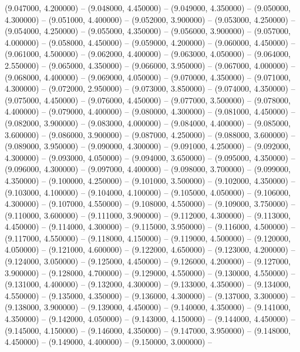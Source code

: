(9.047000, 4.200000) -- 
(9.048000, 4.450000) -- 
(9.049000, 4.350000) -- 
(9.050000, 4.300000) -- 
(9.051000, 4.400000) -- 
(9.052000, 3.900000) -- 
(9.053000, 4.250000) -- 
(9.054000, 4.250000) -- 
(9.055000, 4.350000) -- 
(9.056000, 3.900000) -- 
(9.057000, 4.000000) -- 
(9.058000, 4.450000) -- 
(9.059000, 4.200000) -- 
(9.060000, 4.450000) -- 
(9.061000, 4.500000) -- 
(9.062000, 4.400000) -- 
(9.063000, 4.050000) -- 
(9.064000, 2.550000) -- 
(9.065000, 4.350000) -- 
(9.066000, 3.950000) -- 
(9.067000, 4.000000) -- 
(9.068000, 4.400000) -- 
(9.069000, 4.050000) -- 
(9.070000, 4.350000) -- 
(9.071000, 4.300000) -- 
(9.072000, 2.950000) -- 
(9.073000, 3.850000) -- 
(9.074000, 4.350000) -- 
(9.075000, 4.450000) -- 
(9.076000, 4.450000) -- 
(9.077000, 3.500000) -- 
(9.078000, 4.400000) -- 
(9.079000, 4.400000) -- 
(9.080000, 4.300000) -- 
(9.081000, 4.450000) -- 
(9.082000, 3.900000) -- 
(9.083000, 4.000000) -- 
(9.084000, 4.400000) -- 
(9.085000, 3.600000) -- 
(9.086000, 3.900000) -- 
(9.087000, 4.250000) -- 
(9.088000, 3.600000) -- 
(9.089000, 3.950000) -- 
(9.090000, 4.300000) -- 
(9.091000, 4.250000) -- 
(9.092000, 4.300000) -- 
(9.093000, 4.050000) -- 
(9.094000, 3.650000) -- 
(9.095000, 4.350000) -- 
(9.096000, 4.300000) -- 
(9.097000, 4.400000) -- 
(9.098000, 3.700000) -- 
(9.099000, 4.350000) -- 
(9.100000, 4.250000) -- 
(9.101000, 3.500000) -- 
(9.102000, 4.350000) -- 
(9.103000, 4.100000) -- 
(9.104000, 4.100000) -- 
(9.105000, 4.050000) -- 
(9.106000, 4.300000) -- 
(9.107000, 4.550000) -- 
(9.108000, 4.550000) -- 
(9.109000, 3.750000) -- 
(9.110000, 3.600000) -- 
(9.111000, 3.900000) -- 
(9.112000, 4.300000) -- 
(9.113000, 4.450000) -- 
(9.114000, 4.300000) -- 
(9.115000, 3.950000) -- 
(9.116000, 4.500000) -- 
(9.117000, 4.550000) -- 
(9.118000, 4.150000) -- 
(9.119000, 4.500000) -- 
(9.120000, 4.050000) -- 
(9.121000, 4.600000) -- 
(9.122000, 4.650000) -- 
(9.123000, 4.200000) -- 
(9.124000, 3.050000) -- 
(9.125000, 4.450000) -- 
(9.126000, 4.200000) -- 
(9.127000, 3.900000) -- 
(9.128000, 4.700000) -- 
(9.129000, 4.550000) -- 
(9.130000, 4.550000) -- 
(9.131000, 4.400000) -- 
(9.132000, 4.300000) -- 
(9.133000, 4.350000) -- 
(9.134000, 4.550000) -- 
(9.135000, 4.350000) -- 
(9.136000, 4.300000) -- 
(9.137000, 3.300000) -- 
(9.138000, 3.900000) -- 
(9.139000, 4.450000) -- 
(9.140000, 4.350000) -- 
(9.141000, 4.350000) -- 
(9.142000, 4.050000) -- 
(9.143000, 4.150000) -- 
(9.144000, 4.450000) -- 
(9.145000, 4.150000) -- 
(9.146000, 4.350000) -- 
(9.147000, 3.950000) -- 
(9.148000, 4.450000) -- 
(9.149000, 4.400000) -- 
(9.150000, 3.000000) -- 
